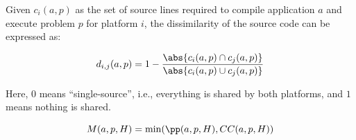 \begin{definition}
Given $c_i(a, p)$ as the set of source lines required to compile application $a$ and execute problem $p$ for platform $i$, the dissimilarity of the source code can be expressed as:

$$d_{i, j}(a, p) = 1 - \frac{\abs{c_i(a, p) \cap c_j(a, p)}}{\abs{c_i(a, p) \cup c_j(a, p)}}$$
\end{definition}
Here, $0$ means \enquote{single-source}, i.e., everything is shared by both platforms, and $1$ means nothing is shared. 

\begin{definition}
    $$M(a, p, H) = \min(\pp(a, p, H), CC(a, p, H))$$
\end{definition}

\newpage
\cite{yokota_beginners_2018}

